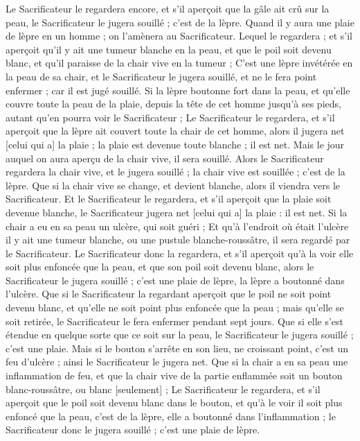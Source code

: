 \begin{multicols}{2}
Le Sacrificateur le regardera encore, et s'il aperçoit que la gâle ait crû sur la peau, le Sacrificateur le jugera souillé ; c'est de la lèpre.
Quand il y aura une plaie de lèpre en un homme ; on l'amènera au Sacrificateur.
Lequel le regardera ; et s'il aperçoit qu'il y ait une tumeur blanche en la peau, et que le poil soit devenu blanc, et qu'il paraisse de la chair vive en la tumeur ;
C'est une lèpre invétérée en la peau de sa chair, et le Sacrificateur le jugera souillé, et ne le fera point enfermer ; car il est jugé souillé.
Si la lèpre boutonne fort dans la peau, et qu'elle couvre toute la peau de la plaie, depuis la tête de cet homme jusqu'à ses pieds, autant qu'en pourra voir le Sacrificateur ;
Le Sacrificateur le regardera, et s'il aperçoit que la lèpre ait couvert toute la chair de cet homme, alors il jugera net [celui qui a] la plaie ; la plaie est devenue toute blanche ; il est net.
Mais le jour auquel on aura aperçu de la chair vive, il sera souillé.
Alors le Sacrificateur regardera la chair vive, et le jugera souillé ; la chair vive est souillée ; c'est de la lèpre.
Que si la chair vive se change, et devient blanche, alors il viendra vers le Sacrificateur.
Et le Sacrificateur le regardera, et s'il aperçoit que la plaie soit devenue blanche, le Sacrificateur jugera net [celui qui a] la plaie : il est net.
Si la chair a eu en sa peau un ulcère, qui soit guéri ;
Et qu'à l'endroit où était l'ulcère il y ait une tumeur blanche, ou une pustule blanche-roussâtre, il sera regardé par le Sacrificateur.
Le Sacrificateur donc la regardera, et s'il aperçoit qu'à la voir elle soit plus enfoncée que la peau, et que son poil soit devenu blanc, alors le Sacrificateur le jugera souillé ; c'est une plaie de lèpre, la lèpre a boutonné dans l'ulcère.
Que si le Sacrificateur la regardant aperçoit que le poil ne soit point devenu blanc, et qu'elle ne soit point plus enfoncée que la peau ; mais qu'elle se soit retirée, le Sacrificateur le fera enfermer pendant sept jours.
Que si elle s'est étendue en quelque sorte que ce soit sur la peau, le Sacrificateur le jugera souillé ; c'est une plaie.
Mais si le bouton s'arrête en son lieu, ne croissant point, c'est un feu d'ulcère ; ainsi le Sacrificateur le jugera net.
Que si la chair a en sa peau une inflammation de feu, et que la chair vive de la partie enflammée soit un bouton blanc-roussâtre, ou blanc [seulement] ;
Le Sacrificateur le regardera, et s'il aperçoit que le poil soit devenu blanc dans le bouton, et qu'à le voir il soit plus enfoncé que la peau, c'est de la lèpre, elle a boutonné dans l'inflammation ; le Sacrificateur donc le jugera souillé ; c'est une plaie de lèpre.

\end{multicols}
